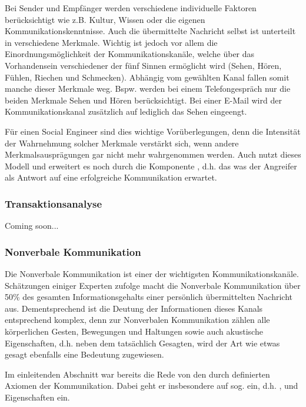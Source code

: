 Bei Sender und Empfänger werden verschiedene individuelle Faktoren berücksichtigt wie z.B. Kultur, Wissen oder die eigenen Kommunikationskenntnisse.
Auch die übermittelte Nachricht selbst ist unterteilt in verschiedene Merkmale.
Wichtig ist jedoch vor allem die Einordnungsmöglichkeit der Kommunikationskanäle, welche über das Vorhandensein verschiedener der fünf Sinnen ermöglicht wird (Sehen, Hören, Fühlen, Riechen und Schmecken).
Abhängig vom gewählten Kanal fallen somit manche dieser Merkmale weg.
Bspw. werden bei einem Telefongespräch nur die beiden Merkmale Sehen und Hören berücksichtigt.
Bei einer E-Mail wird der Kommunikationskanal zusätzlich auf lediglich das Sehen eingeengt.
\citep{human-hacking}

Für einen Social Engineer sind dies wichtige Vorüberlegungen, denn die Intensität der Wahrnehmung solcher Merkmale verstärkt sich, wenn andere Merkmalsausprägungen gar nicht mehr wahrgenommen werden.
Auch  nutzt dieses Modell und erweitert es noch durch die Komponente , d.h. das was der Angreifer als Antwort auf eine erfolgreiche Kommunikation erwartet.
\citep{human-hacking}

\subsubsection*{Transaktionsanalyse}

Coming soon...

\subsubsection{Nonverbale Kommunikation}\label{sec:nonverbale-kommunikation}

Die Nonverbale Kommunikation ist einer der wichtigsten Kommunikationskanäle.
Schätzungen einiger Experten zufolge macht die Nonverbale Kommunikation über 50\% des gesamten Informationsgehalts einer persönlich übermittelten Nachricht aus.
Dementsprechend ist die Deutung der Informationen dieses Kanals entsprechend komplex, denn zur Nonverbalen Kommunikation zählen alle körperlichen Gesten, Bewegungen und Haltungen sowie auch akustische Eigenschaften, d.h. neben dem tatsächlich Gesagten, wird der Art wie etwas gesagt ebenfalls eine Bedeutung zugewiesen.
\citep{hadnagy}

Im einleitenden Abschnitt  war bereits die Rede von den durch  definierten Axiomen der Kommunikation.
Dabei geht er insbesondere auf sog.  ein, d.h. ,  und  Eigenschaften ein.

